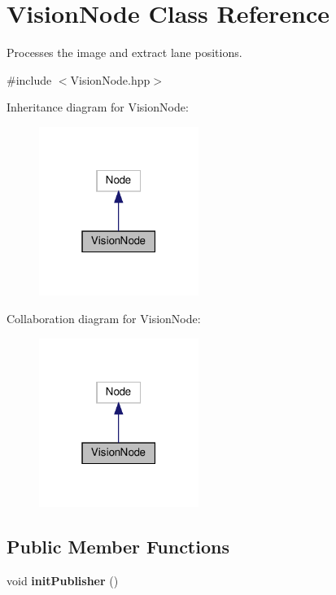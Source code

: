 \hypertarget{classVisionNode}{}\section{Vision\+Node Class Reference}
\label{classVisionNode}


Processes the image and extract lane positions.  




{\ttfamily \#include $<$Vision\+Node.\+hpp$>$}



Inheritance diagram for Vision\+Node\+:
\nopagebreak
\begin{figure}[H]
\begin{center}
\leavevmode
\includegraphics[width=147pt]{classVisionNode__inherit__graph}
\end{center}
\end{figure}


Collaboration diagram for Vision\+Node\+:
\nopagebreak
\begin{figure}[H]
\begin{center}
\leavevmode
\includegraphics[width=147pt]{classVisionNode__coll__graph}
\end{center}
\end{figure}
\subsection*{Public Member Functions}
\begin{DoxyCompactItemize}
\item 
\mbox{\label{classVisionNode_ab4d1d91b22f01874793337e9f3ae2083}} 
void {\bfseries init\+Publisher} ()
\end{DoxyCompactItemize}
